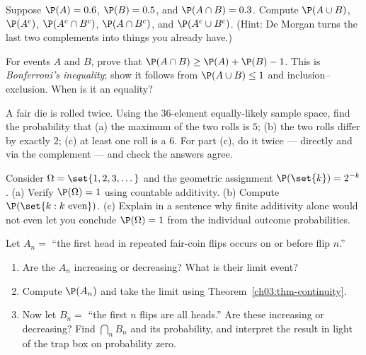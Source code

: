 \begin{exercise}
\label{ch03:exr-warmup}
Suppose $\P(A) = 0.6$, $\P(B) = 0.5$, and $\P(A \cap B) = 0.3$. Compute
$\P(A \cup B)$, $\P(A^c)$, $\P(A^c \cap B^c)$, $\P(A \cap B^c)$, and
$\P(A^c \cup B^c)$. (Hint: De Morgan turns the last two complements into things
you already have.)
\end{exercise}

\begin{exercise}
\label{ch03:exr-bound}
For events $A$ and $B$, prove that $\P(A \cap B) \ge \P(A) + \P(B) - 1$. This is
\emph{Bonferroni's inequality}; show it follows from
$\P(A\cup B)\le 1$ and inclusion--exclusion. When is it an equality?
\end{exercise}

\begin{exercise}
\label{ch03:exr-counting}
A fair die is rolled twice. Using the $36$-element equally-likely sample space,
find the probability that (a) the maximum of the two rolls is $5$; (b) the two
rolls differ by exactly $2$; (c) at least one roll is a $6$. For part (c), do it
twice --- directly and via the complement --- and check the answers agree.
\end{exercise}

\begin{exercise}
\label{ch03:exr-fin-vs-count}
Consider $\Omega = \set{1,2,3,\dots}$ and the geometric assignment
$\P(\set{k}) = 2^{-k}$. (a) Verify $\P(\Omega) = 1$ using countable additivity.
(b) Compute $\P(\set{k : k \text{ even}})$. (c) Explain in a sentence why finite
additivity alone would not even let you conclude $\P(\Omega) = 1$ from the
individual outcome probabilities.
\end{exercise}

\begin{exercise}
\label{ch03:exr-continuity}
Let $A_n = $ ``the first head in repeated fair-coin flips occurs on or before
flip $n$.''
\begin{enumerate}[label=(\alph*)]
\item Are the $A_n$ increasing or decreasing? What is their limit event?
\item Compute $\P(A_n)$ and take the limit using
Theorem~\ref{ch03:thm-continuity}.
\item Now let $B_n = $ ``the first $n$ flips are all heads.'' Are these
increasing or decreasing? Find $\bigcap_n B_n$ and its probability, and interpret
the result in light of the trap box on probability zero.
\end{enumerate}
\end{exercise}

